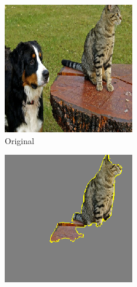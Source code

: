 \begin{figure}[ht]
  \centering
  \begin{subfigure}{0.32\linewidth}
    \includegraphics[width=\linewidth]{figures/lime_orig.png}
    \caption{Original}
    \label{fig:bird-a}
  \end{subfigure}
  \begin{subfigure}{0.32\linewidth}
    \includegraphics[width=\linewidth]{figures/lime_cat_mask.png}

\end{subfigure}
\end{figure}
